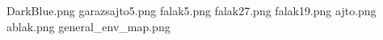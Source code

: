DarkBlue.png
garazsajto5.png
falak5.png
falak27.png
falak19.png
ajto.png
ablak.png
general_env_map.png
